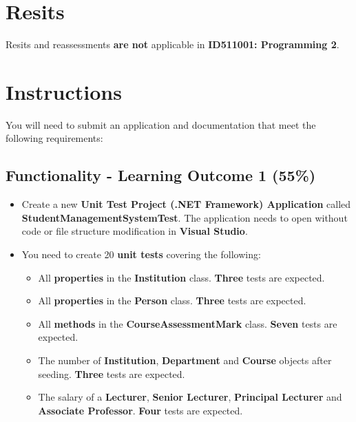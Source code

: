 \documentclass{article}
\begin{document}
\section*{Resits}
Resits and reassessments \textbf{are not} applicable in \textbf{ID511001: Programming 2}.

\section*{Instructions}
You will need to submit an application and documentation that meet the following requirements:

\subsection*{Functionality - Learning Outcome 1 (55\%)}
\begin{itemize}
    \item Create a new \textbf{Unit Test Project (.NET Framework) Application} called \textbf{StudentManagementSystemTest}. The application needs to open without code or file structure modification in \textbf{Visual Studio}.
    \item You need to create 20 \textbf{unit tests} covering the following:
    \begin{itemize}
        \item All \textbf{properties} in the \textbf{Institution} class. \textbf{Three} tests are expected.
        \item All \textbf{properties} in the \textbf{Person} class. \textbf{Three} tests are expected.
        \item All \textbf{methods} in the \textbf{CourseAssessmentMark} class. \textbf{Seven} tests are expected.
        \item The number of \textbf{Institution}, \textbf{Department} and \textbf{Course} objects after seeding. \textbf{Three} tests are expected.
        \item The salary of a \textbf{Lecturer}, \textbf{Senior Lecturer}, \textbf{Principal Lecturer} and \textbf{Associate Professor}. \textbf{Four} tests are expected.
    \end{itemize}
\end{itemize}
\end{document}
